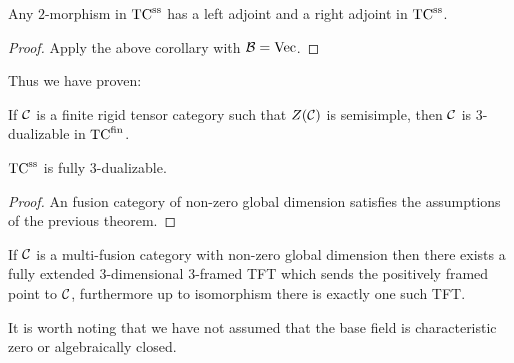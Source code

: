 \documentclass{amsart}
\begin{document}
\begin{corollary}
Any $2$-morphism in ${\mathrm{TC}^{\text{ss}}}$ has a left adjoint and a right adjoint in ${\mathrm{TC}^{\text{ss}}}$.
\end{corollary}
\begin{proof}
Apply the above corollary with $\mathcal B = \mathrm{Vec}$.
\end{proof}

Thus we have proven:

\begin{theorem}
	If $\mathcal C$ is a finite rigid tensor category such that $Z(\mathcal C)$ is semisimple, then $\mathcal C$ is 3-dualizable in ${\mathrm{TC}^{\text{fin}}}$. 
\end{theorem}

\begin{corollary}
 ${\mathrm{TC}^{\text{ss}}}$ is fully 3-dualizable.
\end{corollary}

\begin{proof}
	An fusion category of non-zero global dimension satisfies the assumptions of the previous theorem. 
\end{proof}




\begin{corollary}
If $\mathcal C$ is a multi-fusion category with non-zero global dimension then there exists a fully extended $3$-dimensional $3$-framed TFT which sends the positively framed point to $\mathcal C$, furthermore up to isomorphism there is exactly one such TFT.
\end{corollary}

\begin{remark}
It is worth noting that we have not assumed that the base field is characteristic zero or algebraically closed.
\end{remark}

\end{document}
